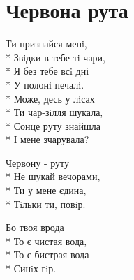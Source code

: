 \vspace{\fill}\newpage

\section{Червона рута}
\label{song:Червона_рута}

\medskip

\begin{minipage}{\linewidth}
Ти признайся менi,\\*
Звiдки в тебе тi чари,\\*
Я без тебе всi дні\\*
У полонi печалi.\\*
Може, десь у лiсах\\*
Ти чар-зiлля шукала,\\*
Сонце руту знайшла\\*
І мене зчарувала?\\
\end{minipage}\par\medskip\nobreak

\medskip

\begin{minipage}{\linewidth}
\hspace*{1.5em}Червону - руту\\*
\hspace*{1.5em}Не шукай вечорами,\\*
\hspace*{1.5em}Ти у мене єдина,\\*
\hspace*{1.5em}Тiльки ти, повiр.\\
\end{minipage}\par\medskip\nobreak

\medskip

\begin{minipage}{\linewidth}
\hspace*{1.5em}Бо твоя врода\\*
\hspace*{1.5em}То є чистая вода,\\*
\hspace*{1.5em}То є бистрая вода\\*
\hspace*{1.5em}Синiх гiр.\\
\end{minipage}\par\medskip\nobreak

